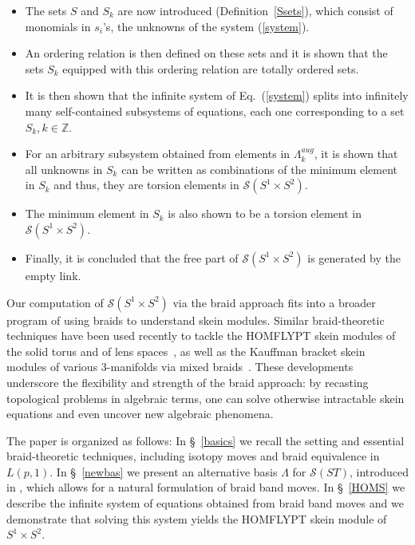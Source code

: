 \documentclass[11pt]{amsart}
\begin{document}
\begin{itemize}
\item[$\bullet$] The sets $S$ and $S_k$ are now introduced (Definition~\ref{Ssets}), which consist of monomials in $s_i$'s, the unknowns of the system (\ref{system}).
\item[$\bullet$] An ordering relation is then defined on these sets and it is shown that the sets $S_k$ equipped with this ordering relation are totally ordered sets.
\item[$\bullet$] It is then shown that the infinite system of Eq.~(\ref{system}) splits into infinitely many self-contained subsystems of equations, each one corresponding to a set $S_k, k\in \mathbb{Z}$.
\item[$\bullet$] For an arbitrary subsystem obtained from elements in $\Lambda_k^{aug}$, it is shown that all unknowns in $S_k$ can be written as combinations of the minimum element in $S_k$ and thus, they are torsion elements in $\mathcal{S}(S^1 \times S^2)$.
\item[$\bullet$] The minimum element in $S_k$ is also shown to be a torsion element in $\mathcal{S}(S^1 \times S^2)$.
\item[$\bullet$] Finally, it is concluded that the free part of $\mathcal{S}(S^1 \times S^2)$ is generated by the empty link.
\end{itemize}

\bigbreak

Our computation of $\mathcal{S}(S^1 \times S^2)$ via the braid approach fits into a broader program of using braids to understand skein modules. Similar braid-theoretic techniques have been used recently to tackle the HOMFLYPT skein modules of the solid torus and of lens spaces~\cite{DL3,DL4, DGLM}, as well as the Kauffman bracket skein modules of various $3$-manifolds via mixed braids~\cite{D2022CCM, D2023arXiv, D2023KBSM}. These developments underscore the flexibility and strength of the braid approach: by recasting topological problems in algebraic terms, one can solve otherwise intractable skein equations and even uncover new algebraic phenomena.

The paper is organized as follows: In \S~\ref{basics} we recall the setting and essential braid-theoretic techniques, including isotopy moves and braid equivalence in $L(p, 1)$. In \S~\ref{newbas} we present an alternative basis $\Lambda$ for $\mathcal{S}(ST)$, introduced in \cite{DL2}, which allows for a natural formulation of braid band moves. In \S~\ref{HOMS} we describe the infinite system of equations obtained from braid band moves and we demonstrate that solving this system yields the HOMFLYPT skein module of $S^1 \times S^2$.
\end{document}
